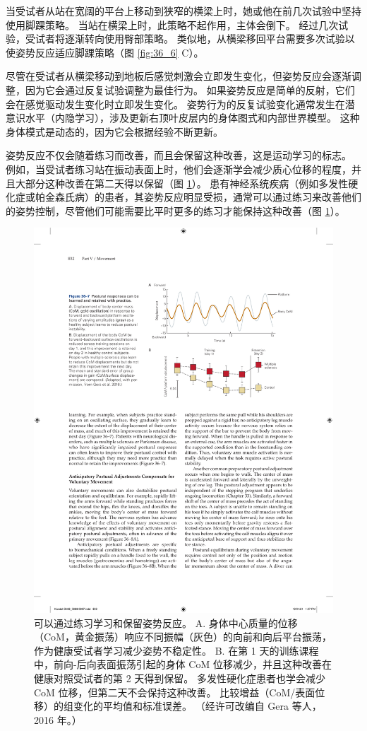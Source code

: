 当受试者从站在宽阔的平台上移动到狭窄的横梁上时，她或他在前几次试验中坚持使用脚踝策略。 当站在横梁上时，此策略不起作用，主体会倒下。 经过几次试验，受试者将逐渐转向使用臀部策略。 类似地，从横梁移回平台需要多次试验以使姿势反应适应脚踝策略（图 \ref{fig:36_6} C）。

尽管在受试者从横梁移动到地板后感觉刺激会立即发生变化，但姿势反应会逐渐调整，因为它会通过反复试验调整为最佳行为。 如果姿势反应是简单的反射，它们会在感觉驱动发生变化时立即发生变化。 姿势行为的反复试验变化通常发生在潜意识水平（内隐学习），涉及更新右顶叶皮层内的身体图式和内部世界模型。 这种身体模式是动态的，因为它会根据经验不断更新。

姿势反应不仅会随着练习而改善，而且会保留这种改善，这是运动学习的标志。 
例如，当受试者练习站在振动表面上时，他们会逐渐学会减少质心位移的程度，并且大部分这种改善在第二天得以保留（图 \ref{fig:36_7}）。
患有神经系统疾病（例如多发性硬化症或帕金森氏病）的患者，其姿势反应明显受损，通常可以通过练习来改善他们的姿势控制，尽管他们可能需要比平时更多的练习才能保持这种改善（图 \ref{fig:36_7}）。

\begin{figure}[htbp]
	\centering
	\includegraphics[width=0.7\linewidth]{chap36/fig_36_7}
	\caption{可以通过练习学习和保留姿势反应。 A. 身体中心质量的位移（CoM，黄金振荡）响应不同振幅（灰色）的向前和向后平台振荡，作为健康受试者学习减少姿势不稳定性。 B. 在第 1 天的训练课程中，前向-后向表面振荡引起的身体 CoM 位移减少，并且这种改善在健康对照受试者的第 2 天得到保留。 多发性硬化症患者也学会减少 CoM 位移，但第二天不会保持这种改善。 比较增益（CoM/表面位移）的组变化的平均值和标准误差。 （经许可改编自 Gera 等人，2016 年。）}
	\label{fig:36_7}
\end{figure}

